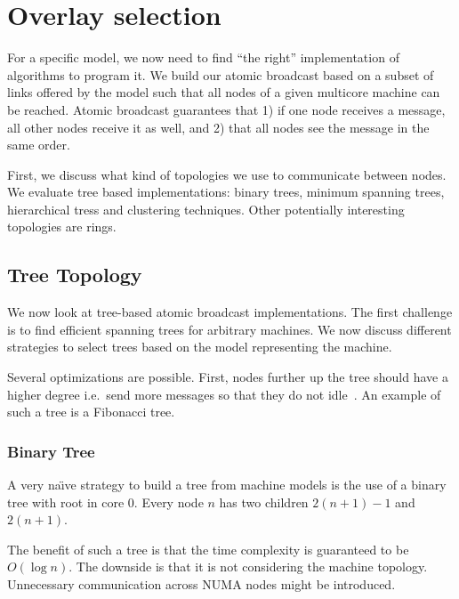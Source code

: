\documentclass{article}
\newcommand{\naive}{na\"{\i}ve\xspace}
\begin{document}
\section{Overlay selection}
\label{sec:overlay}

For a specific model, we now need to find ``the right'' implementation
of algorithms to program it. We build our atomic broadcast based on a
subset of links offered by the model such that all nodes of a given
multicore machine can be reached. Atomic broadcast guarantees that 1)
if one node receives a message, all other nodes receive it as well,
and 2) that all nodes see the message in the same order.

First, we discuss what kind of topologies we use to communicate
between nodes. We evaluate tree based implementations: binary trees,
minimum spanning trees, hierarchical tress and clustering
techniques. Other potentially interesting topologies are rings.

\subsection{Tree Topology}

We now look at tree-based atomic broadcast implementations. The first
challenge is to find efficient spanning trees for arbitrary
machines. We now discuss different strategies to select trees based on
the model representing the machine.

Several optimizations are possible. First, nodes further up the tree
should have a higher degree i.e.\ send more messages so that they do
not idle~\cite{Bar-Noy1994}. An example of such a tree is a Fibonacci
tree. 

\subsubsection{Binary Tree}

A very \naive strategy to build a tree from machine models is the use
of a binary tree with root in core 0. Every node $n$ has two children
$2(n+1)-1$ and $2(n+1)$.

The benefit of such a tree is that the time complexity is guaranteed
to be $O(\log{n})$. The downside is that it is not considering the
machine topology. Unnecessary communication across NUMA nodes might be
introduced. 
\end{document}
